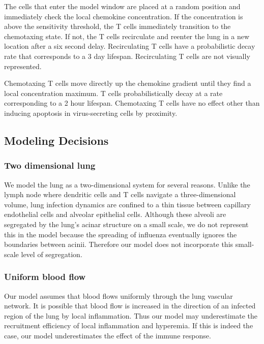 \documentclass[preprint,10pt,authoryear]{elsarticle}
\begin{document}
The cells that enter the model window are placed at a random position and immediately check the local chemokine concentration.  If the concentration is above the sensitivity threshold, the T cells immediately transition to the chemotaxing state.  If not, the T cells recirculate and reenter the lung in a new location after a six second delay.  Recirculating T cells have a probabilistic decay rate that corresponds to a 3 day lifespan.  Recirculating T cells are not visually represented.  

Chemotaxing T cells move directly up the chemokine gradient until they find a local concentration maximum.  T cells probabilistically decay at a rate corresponding to a 2 hour lifespan.  Chemotaxing T cells have no effect other than inducing apoptosis in virus-secreting cells by proximity.


\subsection{Modeling Decisions}

\subsubsection{Two dimensional lung}

We model the lung as a two-dimensional system for several reasons.  Unlike the lymph node where dendritic cells and T cells navigate a three-dimensional volume, lung infection dynamics are confined to a thin tissue between capillary endothelial cells and alveolar epithelial cells.  Although these alveoli are segregated by the lung's acinar structure on a small scale, we do not represent this in the model because the spreading of influenza eventually ignores the boundaries between acinii.  Therefore our model does not incorporate this small-scale level of segregation. 

\subsubsection{Uniform blood flow}

Our model assumes that blood flows uniformly through the lung vascular network.  It is possible that blood flow is increased in the direction of an infected region of the lung by local inflammation.  Thus our model may underestimate the recruitment efficiency of local inflammation and hyperemia.  If this is indeed the case, our model underestimates the effect of the immune response.
\end{document}
